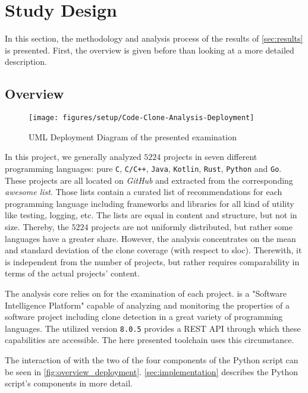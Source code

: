 
\section{Study Design}
\label{sec:study_design}

In this section, the methodology and analysis process of the results of \autoref{sec:results} is presented. First, the overview is given before than looking at a more detailed description.


\subsection{Overview}

\begin{figure}[tbh]
	\centering
	\texttt{[image: figures/setup/Code-Clone-Analysis-Deployment]}
	\caption{UML Deployment Diagram of the presented examination}
	\label{fig:overview_deployment}
\end{figure}

In this project, we generally analyzed $5224$ projects in seven different programming languages: pure \texttt{C}, \texttt{C/C++}, \texttt{Java}, \texttt{Kotlin}, \texttt{Rust}, \texttt{Python} and \texttt{Go}. These projects are all located on \textit{GitHub} and extracted from the corresponding \textit{awesome list}\awesomeFootnote{}. Those lists contain a curated list of recommendations for each programming language including frameworks and libraries for all kind of utility like testing, logging, etc.
The lists are equal in content and structure, but not in size. Thereby, the $5224$ projects are not uniformly distributed, but rather some languages have a greater share. However, the analysis concentrates on the mean and standard deviation of the clone coverage (with respect to \ac{sloc}). Therewith, it is independent from the number of projects, but rather requires comparability in terms of the actual projects' content.

The analysis core relies on \teamscale{}\teamscaleFootnote{} for the examination of each project. \teamscale{} is a "Software Intelligence Platform" capable of analyzing and monitoring the properties of a software project including clone detection in a great variety of programming languages. The utilized version \texttt{8.0.5} provides a REST API through which these capabilities are accessible. The here presented toolchain uses this circumstance.

The interaction of \teamscale{} with the two of the four components of the Python script\gitFootnote{} can be seen in \autoref{fig:overview_deployment}. \autoref{sec:implementation} describes the Python script's components in more detail.

